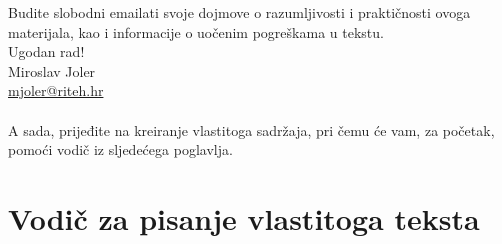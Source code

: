 Budite slobodni emailati svoje dojmove o razumljivosti i praktičnosti ovoga materijala, kao i informacije o uočenim pogreškama u tekstu. \\

\noindent Ugodan rad! \\

\noindent Miroslav Joler	\\	
\href{mailto:mjoler@riteh.hr}{mjoler@riteh.hr}	\\ \\


{\color{red} A sada, prijeđite na kreiranje vlastitoga sadržaja, pri čemu će vam, za početak, pomoći vodič iz sljedećega poglavlja.}


\chapter{Vodič za pisanje vlastitoga teksta}

